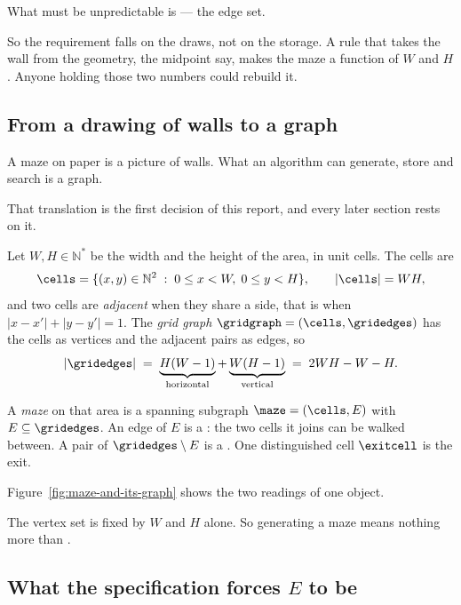What must be unpredictable is  --- the edge set.

So the requirement falls on the draws, not on the storage. A rule that takes the
wall from the geometry, the midpoint say, makes the maze a function of $W$ and
$H$. Anyone holding those two numbers could rebuild it.

\subsection{From a drawing of walls to a graph}

A maze on paper is a picture of walls. What an algorithm can generate, store and
search is a graph.

That translation is the first decision of this report, and every later section
rests on it.

\begin{definition}
Let $W,H\in\mathbb{N}^{*}$ be the width and the height of the area, in unit
cells. The cells are
\[
  \cells=\{(x,y)\in\mathbb{N}^{2}\;:\;0\le x<W,\;0\le y<H\},
  \qquad |\cells|=WH,
\]
and two cells are \emph{adjacent} when they share a side, that is when
$|x-x'|+|y-y'|=1$. The \emph{grid graph} $\gridgraph=(\cells,\gridedges)$ has
the cells as vertices and the adjacent pairs as edges, so
\[
  |\gridedges| \;=\; \underbrace{H(W-1)}_{\text{horizontal}}
                  +\underbrace{W(H-1)}_{\text{vertical}}
               \;=\; 2WH-W-H .
\]
\end{definition}

\begin{definition}[Maze]
A \emph{maze} on that area is a spanning subgraph $\maze=(\cells,E)$ with
$E\subseteq\gridedges$. An edge of $E$ is a : the two cells it
joins can be walked between. A pair of $\gridedges\setminus E$ is a
. One distinguished cell $\exitcell$ is the exit.
\end{definition}

Figure~\ref{fig:maze-and-its-graph} shows the two readings of one object.

The vertex set is fixed by $W$ and $H$ alone. So generating a maze means nothing
more than .



\subsection{What the specification forces \texorpdfstring{$E$}{E} to be}

